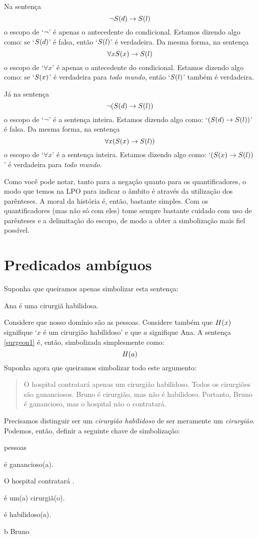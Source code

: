 Na sentença
$$\neg \mathord{S}(d) \rightarrow \mathord{S}(l)$$
o escopo de `$\neg$' é apenas o antecedente do condicional. Estamos dizendo algo como: se `$\mathord{S}(d)$' é falsa, então `$\mathord{S}(l)$' é verdadeira.
Da mesma forma, na sentença
$$\forall x \mathord{S}(x) \rightarrow \mathord{S}(l)$$
o escopo de `$\forall x$' é apenas o antecedente do condicional.
Estamos dizendo algo como: se `$\mathord{S}(x)$' é verdadeira para \emph{todo mundo}, então `$\mathord{S}(l)$' também é verdadeira.

Já na sentença
$$\neg(\mathord{S}(d) \rightarrow \mathord{S}(l))$$
o escopo de `$\neg$' é a sentença inteira.
Estamos dizendo algo como: `$(\mathord{S}(d) \rightarrow \mathord{S}(l))$' é falsa.
Da mesma forma, na sentença
$$\forall x (\mathord{S}(x) \rightarrow \mathord{S}(l))$$
o escopo de `$\forall x$' é a sentença inteira.
Estamos dizendo algo como: `$(\mathord{S}(x) \rightarrow \mathord{S}(l))$' é verdadeira para \emph{todo mundo}.

Como você pode notar, tanto para a negação quanto para os quantificadores, o modo que temos na LPO para indicar o âmbito é  através da utilização dos parênteses.
A moral da história é, então, bastante simples.
Com os quantificadores (mas não só com eles) tome sempre bastante cuidado com  uso de parênteses e a delimitação do escopo, de modo a obter a simbolização mais fiel possível.


\section{Predicados ambíguos}

Suponha que queiramos apenas simbolizar esta sentença:
\begin{earg}
\item[\ex{surgeon1}] Ana é uma cirurgiã habilidosa.
\end{earg}
Considere que nosso domínio são as pessoas.
Considere também que $\mathord{H}(x)$ signifique `$x$ é um cirurgião habilidoso' e que $a$ signifique Ana.
A sentença \ref{surgeon1} é, então, simbolizada simplesmente como:
$$\mathord{H}(a)$$
Suponha agora que queiramos simbolizar todo este argumento:
\begin{quote}
O hospital contratará apenas um cirurgião habilidoso.
Todos os cirurgiões são gananciosos.
Bruno é cirurgião, mas não é habilidoso.
Portanto, Bruno é ganancioso, mas o hospital não o contratará.
\end{quote}
Precisamos distinguir ser um \emph{cirurgião habilidoso} de ser meramente um \emph{cirurgião}.
Podemos, então, definir a seguinte chave de simbolização:
\begin{center}
\begin{ekey}
\item[\text{domínio}] pessoas
\item[\atom{G}{x}]  é ganancioso(a).
\item[\atom{T}{x}] O hospital contratará .
\item[\atom{C}{x}]  é um(a) cirurgiã(o).
\item[\atom{H}{x}]  é habilidoso(a).
\item[b] Bruno
\end{ekey}
\end{center}

